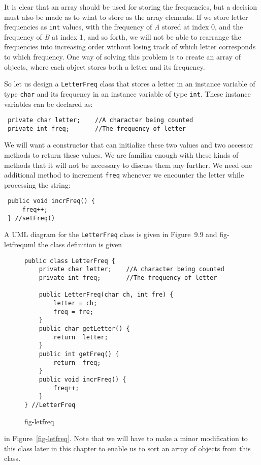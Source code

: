 \noindent It is clear that an array should be used for storing the
frequencies, but a decision must also be made as to what to store as the
array elements.  If we store letter frequencies as {\tt int} values,
with the frequency of {\em A} stored at index 0, and the frequency of
{\em B} at index 1, and so forth, we will not be able to rearrange the
frequencies into increasing order without losing track of which letter
corresponds to which frequency.  One way of solving this problem is to
create an array of objects, where each object stores both a letter and
its frequency.

So let us design a {\tt LetterFreq} class that stores a letter
in an instance variable of type {\tt char} and its frequency in an instance
variable of type {\tt int}. These instance variables can be declared as:

\begin{jjjlisting}
\begin{lstlisting}
 private char letter;    //A character being counted
 private int freq;       //The frequency of letter
\end{lstlisting}
\end{jjjlisting}

\noindent We will want a constructor that can initialize these two values
and two accessor methods to return these values.  We are familiar enough
with these kinds of methods that it will not be necessary to discuss them any
further.  We need one additional method to increment {\tt freq} whenever
we encounter the letter while processing the string:

\begin{jjjlisting}
\begin{lstlisting}
 public void incrFreq() {
     freq++;
 } //setFreq()
\end{lstlisting}
\end{jjjlisting}

A UML diagram for the {\tt LetterFreq} class is given in Figure~9.9 and
{fig-letfrequml}
the class definition is given
\begin{figure}[tb]
\jjjprogstart
\begin{jjjlisting}
\begin{lstlisting}
public class LetterFreq {
    private char letter;    //A character being counted
    private int freq;       //The frequency of letter

    public LetterFreq(char ch, int fre) {
        letter = ch;
        freq = fre;
    }
    public char getLetter() {
        return  letter;
    }
    public int getFreq() {
        return  freq;
    }
    public void incrFreq() {
        freq++;
    }
} //LetterFreq
\end{lstlisting}
\end{jjjlisting}
{fig-letfreq}
\end{figure}
in Figure~\ref{fig-letfreq}. Note that we will have to make a minor
modification to this class later in this chapter to enable us to sort
an array of objects from this class.

